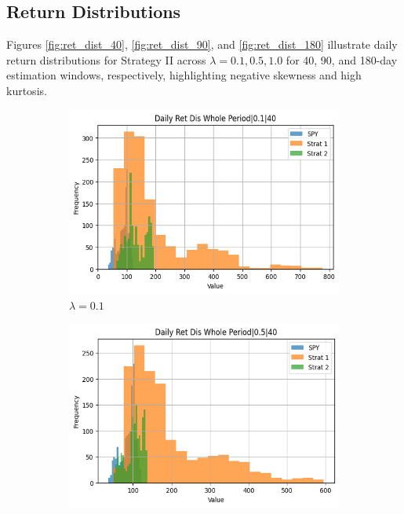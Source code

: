 \documentclass[12pt]{article}
\begin{document}
\subsection{Return Distributions}
Figures \ref{fig:ret_dist_40}, \ref{fig:ret_dist_90}, and \ref{fig:ret_dist_180} illustrate daily return distributions for Strategy II across $\lambda = 0.1, 0.5, 1.0$ for 40, 90, and 180-day estimation windows, respectively, highlighting negative skewness and high kurtosis.

\begin{figure}[H]
\centering
\begin{subfigure}{0.32\textwidth}
\includegraphics[width=\linewidth]{"plots/daily_ret_dis_whole_period_0.1_40.png"}
\caption{$\lambda=0.1$}
\end{subfigure}
\begin{subfigure}{0.32\textwidth}
\includegraphics[width=\linewidth]{"plots/daily_ret_dis_whole_period_0.5_40.png"}

\end{subfigure}
\end{figure}
\end{document}
